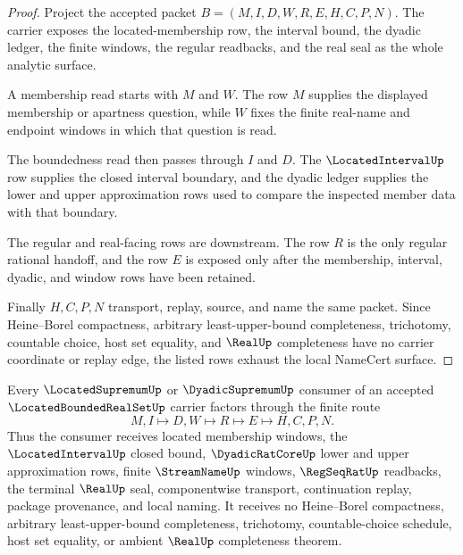 \begin{proof}
Project the accepted packet $B=(M,I,D,W,R,E,H,C,P,N)$. The carrier exposes the located-membership row, the interval bound, the dyadic ledger, the finite windows, the regular readbacks, and the real seal as the whole analytic surface.

A membership read starts with $M$ and $W$. The row $M$ supplies the displayed membership or apartness question, while $W$ fixes the finite real-name and endpoint windows in which that question is read.

The boundedness read then passes through $I$ and $D$. The $\LocatedIntervalUp$ row supplies the closed interval boundary, and the dyadic ledger supplies the lower and upper approximation rows used to compare the inspected member data with that boundary.

The regular and real-facing rows are downstream. The row $R$ is the only regular rational handoff, and the row $E$ is exposed only after the membership, interval, dyadic, and window rows have been retained.

Finally $H,C,P,N$ transport, replay, source, and name the same packet. Since Heine--Borel compactness, arbitrary least-upper-bound completeness, trichotomy, countable choice, host set equality, and $\RealUp$ completeness have no carrier coordinate or replay edge, the listed rows exhaust the local NameCert surface.
\end{proof}

\begin{theorem}
\label{thm:located-bounded-real-set-interval-bound-handoff}
Every $\LocatedSupremumUp$ or $\DyadicSupremumUp$ consumer of an accepted $\LocatedBoundedRealSetUp$ carrier factors through the finite route
$$
M,I \longmapsto D,W \longmapsto R \longmapsto E \longmapsto H,C,P,N .
$$
Thus the consumer receives located membership windows, the $\LocatedIntervalUp$ closed bound, $\DyadicRatCoreUp$ lower and upper approximation rows, finite $\StreamNameUp$ windows, $\RegSeqRatUp$ readbacks, the terminal $\RealUp$ seal, componentwise transport, continuation replay, package provenance, and local naming. It receives no Heine--Borel compactness, arbitrary least-upper-bound completeness, trichotomy, countable-choice schedule, host set equality, or ambient $\RealUp$ completeness theorem.
\end{theorem}

